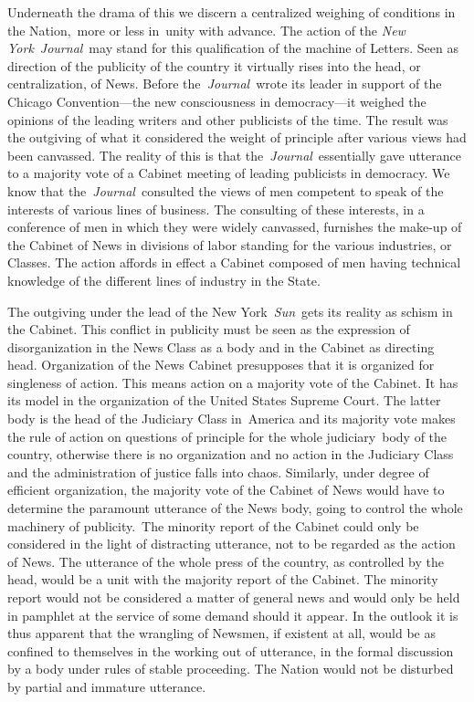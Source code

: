 \documentclass[twoside,symmetric,nobib,justified]{tufte-book}
\begin{document}
Underneath the drama of this we discern a centralized weighing of
conditions in the Nation,~more or less in~unity with advance. The action
of the \emph{New York}~\emph{Journal}~may stand for this qualification
of the machine of Letters. Seen as direction of the publicity of the
country it virtually rises into the head, or centralization, of News.
Before the\emph{~Journal}~wrote its leader in support of the Chicago
Convention---the new consciousness in democracy---it weighed the
opinions of the leading writers and other publicists of the time. The
result was the outgiving of what it considered the weight of principle
after various views had been canvassed. The reality of this is that
the~\emph{Journal}~essentially gave utterance to a majority vote of a
Cabinet meeting of leading publicists in democracy. We know that
the~\emph{Journal~}consulted the views of men competent to speak of the
interests of various lines of business. The consulting of these
interests, in a conference of men in which they were widely canvassed,
furnishes the make-up of the Cabinet of News in divisions of labor
standing for the various industries, or Classes. The action affords in
effect a Cabinet composed of men having technical knowledge of the
different lines of industry in the State.~

The outgiving under the lead of the New York~\emph{Sun}~gets its reality
as schism in the Cabinet. This conflict in publicity must be seen as the
expression of disorganization in the News Class as a body and in the
Cabinet as directing head. Organization of the News Cabinet presupposes
that it is organized for singleness of action. This means action on a
majority vote of the Cabinet. It has its model in the organization of
the United States Supreme Court. The latter body is the head of the
Judiciary Class in~America and its majority vote makes the rule of
action on questions of principle for the whole judiciary~body of the
country, otherwise there is no organization and no action in the
Judiciary Class and the administration of justice falls into chaos.
Similarly, under degree of efficient organization, the majority vote of
the Cabinet of News would have to determine the paramount utterance of
the News body, going to control the whole machinery of publicity.~The
minority report of the Cabinet could only be considered in the light of
distracting utterance, not to be regarded as the action of News. The
utterance of the whole press of the country, as controlled by the head,
would be a unit with the majority report of the Cabinet. The minority
report would not be considered a matter of general news and would only
be held in pamphlet at the service of some demand should it appear. In
the outlook it is thus apparent that the wrangling of Newsmen, if
existent at all, would be as confined to themselves in the working out
of utterance, in the formal discussion by a body under rules of stable
proceeding. The Nation would not be disturbed by partial and immature
utterance.~
\end{document}
